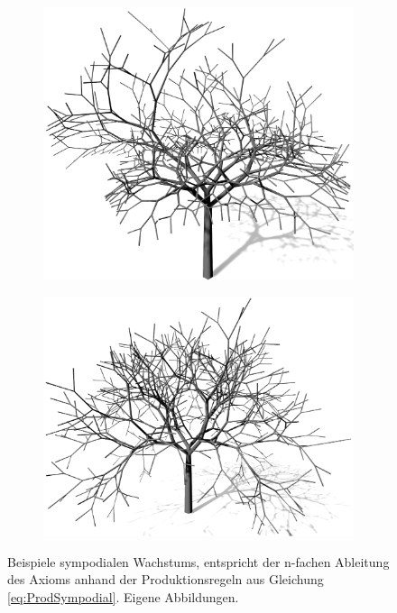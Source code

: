 \begin{figure} [hbtp]
\begin{subfigure}[t]{.45\textwidth}
		\caption{}
		\label{subfig:LS_Sympodial_2}
	\end{subfigure}	
	\begin{subfigure}[t]{.45\textwidth}
		\centering
		\includegraphics[height=.21\textheight]{images/LS_Sympodial_3.png}
		\caption{}
		\label{subfig:LS_Sympodial_3}
	\end{subfigure}
	\begin{subfigure}[t]{.45\textwidth}
		\centering
		\includegraphics[height=.21\textheight]{images/LS_Sympodial_4.png}
		\caption{}
		\label{subfig:LS_Sympodial_4}
	\end{subfigure}
	\caption{Beispiele sympodialen Wachstums, entspricht der n-fachen Ableitung des Axioms anhand der Produktionsregeln aus Gleichung \ref{eq:ProdSympodial}. Eigene Abbildungen.}
	\label{fig:LS_Sympodial}
\end{figure}


